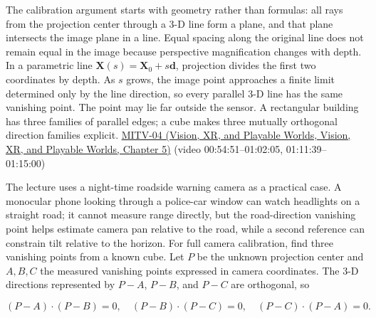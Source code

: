 The calibration argument starts with geometry rather than formulas: all rays from the projection center through a 3-D line form a plane, and that plane intersects the image plane in a line. Equal spacing along the original line does not remain equal in the image because perspective magnification changes with depth. In a parametric line \(\mathbf{X}(s)=\mathbf{X}_0+s\mathbf{d}\), projection divides the first two coordinates by depth. As \(s\) grows, the image point approaches a finite limit determined only by the line direction, so every parallel 3-D line has the same vanishing point. The point may lie far outside the sensor. A rectangular building has three families of parallel edges; a cube makes three mutually orthogonal direction families explicit. \href{../07-Vision-XR-and-Playable-Worlds/main.pdf\#nameddest=04-visual-computing-ii-ch036-mitv-04---fixed-optical-flow-optical-mouse-constant-brightness-assumption-closed-form-solution}{MITV-04 (Vision, XR, and Playable Worlds, Vision, XR, and Playable Worlds, Chapter 5)} (video 00:54:51--01:02:05, 01:11:39--01:15:00)

The lecture uses a night-time roadside warning camera as a practical case. A monocular phone looking through a police-car window can watch headlights on a straight road; it cannot measure range directly, but the road-direction vanishing point helps estimate camera pan relative to the road, while a second reference can constrain tilt relative to the horizon. For full camera calibration, find three vanishing points from a known cube. Let \(P\) be the unknown projection center and \(A,B,C\) the measured vanishing points expressed in camera coordinates. The 3-D directions represented by \(P-A\), \(P-B\), and \(P-C\) are orthogonal, so

\[
(P-A)\cdot(P-B)=0,\quad (P-B)\cdot(P-C)=0,\quad (P-C)\cdot(P-A)=0.
\]

